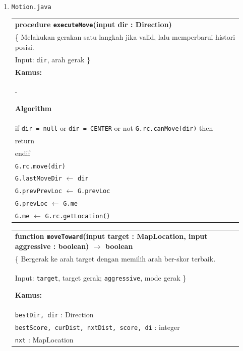 \documentclass{article}
\newenvironment{pseudobox}
{
\centering
\begin{longtable}{|p{0.94\linewidth}|}
\hline
}
{
\\ \hline
\end{longtable}
\vspace{0.05cm}
}
\begin{document}
\begin{enumerate}[label=\alph*.]
\begin{enumerate}[label=\alph*.]
\item \texttt{Motion.java}

\begin{pseudobox}
\textbf{procedure \texttt{executeMove}(input dir : Direction)} \\
\{ Melakukan gerakan satu langkah jika valid, lalu memperbarui histori posisi. \\
Input: \texttt{dir}, arah gerak
\} \\

\textbf{Kamus:} \\
\hspace*{1.5em}-

\textbf{Algorithm} \\
\hspace*{1.5em}if \texttt{dir = null} or \texttt{dir = CENTER} or not \texttt{G.rc.canMove(dir)} then \\
\hspace*{3em}return \\
\hspace*{1.5em}endif \\

\hspace*{1.5em}\texttt{G.rc.move(dir)} \\
\hspace*{1.5em}\texttt{G.lastMoveDir} $\leftarrow$ \texttt{dir} \\
\hspace*{1.5em}\texttt{G.prevPrevLoc} $\leftarrow$ \texttt{G.prevLoc} \\
\hspace*{1.5em}\texttt{G.prevLoc} $\leftarrow$ \texttt{G.me} \\
\hspace*{1.5em}\texttt{G.me} $\leftarrow$ \texttt{G.rc.getLocation()}
\end{pseudobox}

\begin{pseudobox}
\textbf{function \texttt{moveToward}(input target : MapLocation, input aggressive : boolean) $\rightarrow$ boolean} \\
\{ Bergerak ke arah target dengan memilih arah ber-skor terbaik. \\
Input: \texttt{target}, target gerak; \texttt{aggressive}, mode gerak
\}

\textbf{Kamus:} \\
\hspace*{1.5em}\texttt{bestDir, dir} : Direction \\
\hspace*{1.5em}\texttt{bestScore, curDist, nxtDist, score, di} : integer \\
\hspace*{1.5em}\texttt{nxt} : MapLocation


\end{pseudobox}
\end{enumerate}
\end{enumerate}
\end{document}
